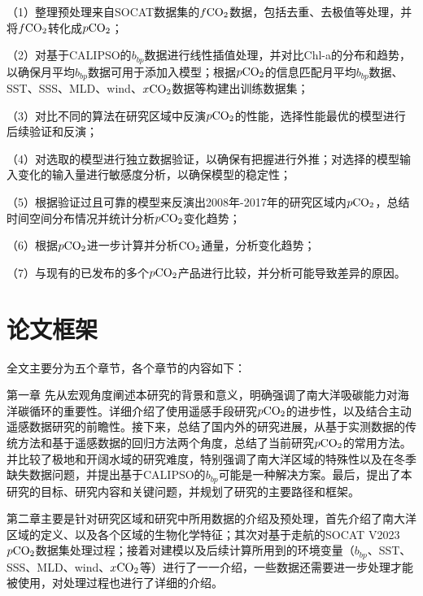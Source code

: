 （1）整理预处理来自SOCAT数据集的$f\rm CO_2$数据，包括去重、去极值等处理，并将$f\rm CO_2$转化成$p\rm CO_2$；

（2）对基于CALIPSO的$b_{bp}$数据进行线性插值处理，并对比Chl-a的分布和趋势，以确保月平均$b_{bp}$数据可用于添加入模型；根据$p\rm CO_2$的信息匹配月平均$b_{bp}$数据、SST、SSS、MLD、wind、$x\rm CO_2$数据等构建出训练数据集；

（3）对比不同的算法在研究区域中反演$p\rm CO_2$的性能，选择性能最优的模型进行后续验证和反演；

（4）对选取的模型进行独立数据验证，以确保有把握进行外推；对选择的模型输入变化的输入量进行敏感度分析，以确保模型的稳定性；

（5）根据验证过且可靠的模型来反演出2008年-2017年的研究区域内$p\rm CO_2$，总结时间空间分布情况并统计分析$p\rm CO_2$变化趋势；

（6）根据$p\rm CO_2$进一步计算并分析$\rm CO_2$通量，分析变化趋势；

（7）与现有的已发布的多个$p\rm CO_2$产品进行比较，并分析可能导致差异的原因。
\section{论文框架}
全文主要分为五个章节，各个章节的内容如下：

第一章 先从宏观角度阐述本研究的背景和意义，明确强调了南大洋吸碳能力对海洋碳循环的重要性。详细介绍了使用遥感手段研究$p\rm CO_2$的进步性，以及结合主动遥感数据研究的前瞻性。接下来，总结了国内外的研究进展，从基于实测数据的传统方法和基于遥感数据的回归方法两个角度，总结了当前研究$p\rm CO_2$的常用方法。并比较了极地和开阔水域的研究难度，特别强调了南大洋区域的特殊性以及在冬季缺失数据问题，并提出基于CALIPSO的$b_{bp}$可能是一种解决方案。最后，提出了本研究的目标、研究内容和关键问题，并规划了研究的主要路径和框架。

第二章主要是针对研究区域和研究中所用数据的介绍及预处理，首先介绍了南大洋区域的定义、以及各个区域的生物化学特征；其次对基于走航的SOCAT V2023 $p\rm CO_2$数据集处理过程；接着对建模以及后续计算所用到的环境变量（$b_{bp}$、SST、SSS、MLD、wind、$x\rm CO_2$等）进行了一一介绍，一些数据还需要进一步处理才能被使用，对处理过程也进行了详细的介绍。

